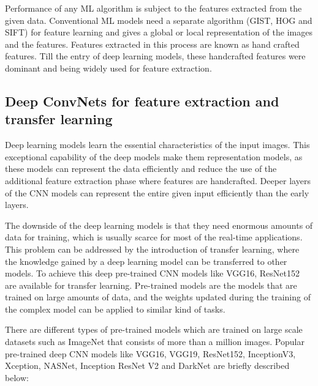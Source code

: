 \documentclass[electronics,article,accept ,moreauthors,pdftex]{mdpi}
\begin{document}
Performance of any ML algorithm is subject to the features extracted from the given data.  
Conventional ML models need a separate algorithm (GIST, HOG and SIFT) for feature learning and gives a global or local representation of the images  and the features.  Features extracted in this process are known as hand crafted features. Till the entry of deep learning models, these handcrafted features were dominant and being widely used for feature extraction.

\subsection{Deep ConvNets for feature extraction and transfer learning}
 Deep learning models\cite{jindal2018drums,vinayakumar2020visualized,alazab2020multidirectional} learn the essential characteristics of the input images.  This exceptional capability of the deep models make them representation models, as these models can represent the data efficiently and reduce the use of the additional feature extraction phase where features are handcrafted. Deeper layers of the CNN models can represent the entire given input efficiently than the early layers. 

The downside of the deep learning models is that they need enormous amounts of data for training, which is usually scarce for most of the real-time applications. This problem can be addressed by the introduction of transfer learning, where the knowledge gained by a deep learning model can be transferred to other models. To achieve this deep pre-trained CNN models like VGG16, ResNet152 are available for transfer learning. Pre-trained models are the models that are trained on large amounts of data, and the weights updated during the training of the complex model can be applied to similar kind of tasks.

There are different types of pre-trained models which are trained on large scale datasets such as  ImageNet that consists of more than a million images. Popular pre-trained deep CNN models like VGG16, VGG19, ResNet152, InceptionV3, Xception, NASNet, Inception ResNet V2 and DarkNet are briefly described below: 
\end{document}
